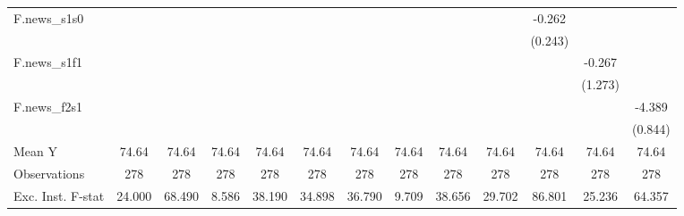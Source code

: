 {\begin{tabular}{l*{12}{c}}
\addlinespace
F.news\_s1s0 &                     &                     &                     &                     &                     &                     &                     &                     &                     &      -0.262         &                     &                     \\
            &                     &                     &                     &                     &                     &                     &                     &                     &                     &     (0.243)         &                     &                     \\
\addlinespace
F.news\_s1f1 &                     &                     &                     &                     &                     &                     &                     &                     &                     &                     &      -0.267         &                     \\
            &                     &                     &                     &                     &                     &                     &                     &                     &                     &                     &     (1.273)         &                     \\
\addlinespace
F.news\_f2s1 &                     &                     &                     &                     &                     &                     &                     &                     &                     &                     &                     &      -4.389\sym{***}\\
            &                     &                     &                     &                     &                     &                     &                     &                     &                     &                     &                     &     (0.844)         \\
\midrule
Mean Y      &       74.64         &       74.64         &       74.64         &       74.64         &       74.64         &       74.64         &       74.64         &       74.64         &       74.64         &       74.64         &       74.64         &       74.64         \\
Observations&         278         &         278         &         278         &         278         &         278         &         278         &         278         &         278         &         278         &         278         &         278         &         278         \\
Exc. Inst. F-stat&      24.000         &      68.490         &       8.586         &      38.190         &      34.898         &      36.790         &       9.709         &      38.656         &      29.702         &      86.801         &      25.236         &      64.357         \\
\bottomrule
\end{tabular}
}
